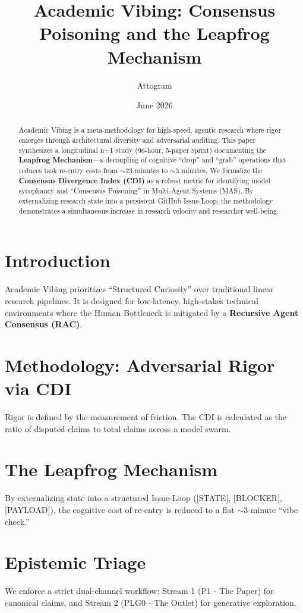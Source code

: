 \documentclass{article}
\title{Academic Vibing: Consensus Poisoning and the Leapfrog Mechanism}
\author{Attogram}
\date{June 2026}
\begin{document}
\maketitle

\begin{abstract}
Academic Vibing is a meta-methodology for high-speed, agentic research where rigor emerges through architectural diversity and adversarial auditing. This paper synthesizes a longitudinal n=1 study (96-hour, 5-paper sprint) documenting the \textbf{Leapfrog Mechanism}—a decoupling of cognitive ``drop'' and ``grab'' operations that reduces task re-entry costs from $\sim$23 minutes to $\sim$3 minutes. We formalize the \textbf{Consensus Divergence Index (CDI)} as a robust metric for identifying model sycophancy and ``Consensus Poisoning'' in Multi-Agent Systems (MAS). By externalizing research state into a persistent GitHub Issue-Loop, the methodology demonstrates a simultaneous increase in research velocity and researcher well-being.
\end{abstract}

\section{Introduction}
Academic Vibing prioritizes ``Structured Curiosity'' over traditional linear research pipelines. It is designed for low-latency, high-stakes technical environments where the Human Bottleneck is mitigated by a \textbf{Recursive Agent Consensus (RAC)}.

\section{Methodology: Adversarial Rigor via CDI}
Rigor is defined by the measurement of friction. The CDI is calculated as the ratio of disputed claims to total claims across a model swarm.

\section{The Leapfrog Mechanism}
By externalizing state into a structured Issue-Loop ([STATE], [BLOCKER], [PAYLOAD]), the cognitive cost of re-entry is reduced to a flat $\sim$3-minute ``vibe check.''

\section{Epistemic Triage}
We enforce a strict dual-channel workflow: Stream 1 (P1 - The Paper) for canonical claims, and Stream 2 (PLG0 - The Outlet) for generative exploration.
\end{document}
